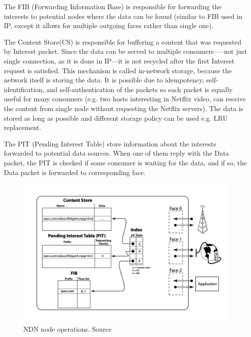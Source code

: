 The FIB (Forwarding 
Information Base) is responsible for forwarding the interests to potential nodes where the data can be found (similar to FIB used in IP, except it allows for multiple outgoing faces rather than single one). 

The Content Store(CS) is responsible for buffering a content that was requested by Interest packet. Since the data can be served to multiple consumers–––not just single connection, as it is done in IP––it is not recycled after the first Interest request is satisfied. This mechanism is called in-network storage, because the network itself is storing the data. It is possible due to idempotency, self-identification, and self-authentication of the packets so each packet is equally useful for many consumers (e.g. two hosts interesting in Netflix video, can receive the content from single node without requesting the Netflix servers). The data is stored as long as possible and different storage policy can be used e.g. LRU replacement.

The PIT (Pending Interest Table) store information about the interests forwarded to potential data sources. When one of them reply with the Data packet, the PIT is checked if some consumer is waiting for the data, and if so, the Data packet is forwarded to corresponding face.
\begin{figure}[h]
    \centering
    \includegraphics[width=\linewidth]{img/ndn-operations.png}
    \caption{NDN node operations. Source \cite{jacobson2009networking}}
    \label{fig:ndn-operations}
\end{figure}

